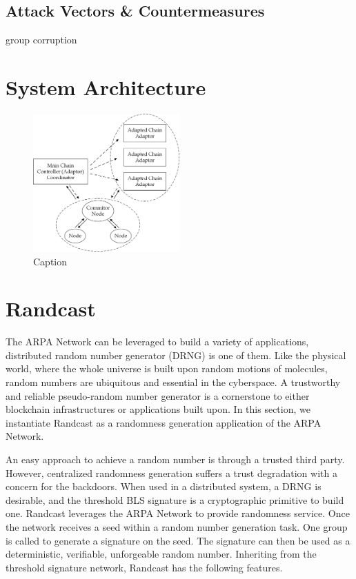 \documentclass[11pt]{article}
\begin{document}
\subsection{Attack Vectors \& Countermeasures}

group corruption


\section{System Architecture}

\begin{figure}
    \centering
    \includegraphics[width=0.5\textwidth]{figures/arpa network high level architecture.png}
    \caption{Caption}
    \label{fig:my_label}
\end{figure}

\section{Randcast}

The ARPA Network can be leveraged to build a variety of applications, distributed random number generator (DRNG) is one of them. Like the physical world, where the whole universe is built upon random motions of molecules, random numbers are ubiquitous and essential in the cyberspace. A trustworthy and reliable pseudo-random number generator is a cornerstone to either blockchain infrastructures or applications built upon. In this section, we instantiate Randcast as a randomness generation application of the ARPA Network.

An easy approach to achieve a random number is through a trusted third party. However, centralized randomness generation suffers a trust degradation with a concern for the backdoors. When used in a distributed system, a DRNG is desirable, and the threshold BLS signature is a cryptographic primitive to build one. Randcast leverages the ARPA Network to provide randomness service. Once the network receives a seed within a random number generation task. One group is called to generate a signature on the seed. The signature can then be used as a deterministic, verifiable, unforgeable random number. Inheriting from the threshold signature network, Randcast has the following features.
\end{document}
